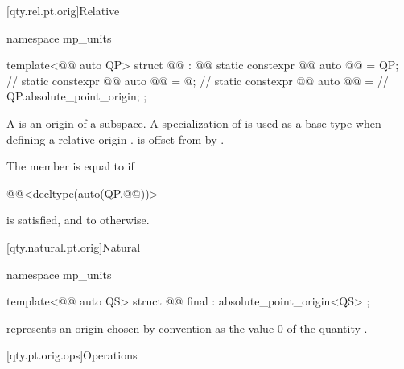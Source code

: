 [qty.rel.pt.orig]{Relative}

\begin{codeblock}
namespace mp_units {

template<@@ auto QP>
struct @@ : @@ {
  static constexpr @@ auto @@ = QP;       // \expos
  static constexpr @@ auto @@ = @\seebelownc@;  // \expos
  static constexpr @@ auto @@ =      // \expos
    QP.absolute_point_origin;
};

}
\end{codeblock}

\pnum
A  is an origin
of a subspace.
A specialization of  is used as a base type when defining a relative origin .
 is offset from  by .

\pnum
The member  is equal to
 if
\begin{codeblock}
@@<decltype(auto(QP.@@))>
\end{codeblock}
is satisfied, and
to  otherwise.

[qty.natural.pt.orig]{Natural}

\begin{codeblock}
namespace mp_units {

template<@@ auto QS>
struct @@ final : absolute_point_origin<QS> {};

}
\end{codeblock}

\pnum
{} represents an origin
chosen by convention as the value $0$ of the quantity .

[qty.pt.orig.ops]{Operations}

